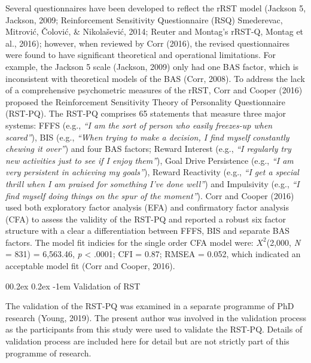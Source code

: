 \documentclass[
  english,
  man,floatsintext]{apa6}
\makeatletter
\renewcommand{\paragraph}{\@startsection{paragraph}{4}{\parindent}%
  {0\baselineskip \@plus 0.2ex \@minus 0.2ex}%
  {-1em}%
  {\normalfont\normalsize\bfseries\itshape\typesectitle}}
\makeatother
\begin{document}
Several questionnaires have been developed to reflect the rRST model (Jackson 5, Jackson, 2009; Reinforcement Sensitivity Questionnaire (RSQ) Smederevac, Mitrović, Čolović, \& Nikolašević, 2014; Reuter and Montag's rRST-Q, Montag et al., 2016); however, when reviewed by Corr (2016), the revised questionnaires were found to have significant theoretical and operational limitations.
For example, the Jackson 5 scale (Jackson, 2009) only had one BAS factor, which is inconsistent with theoretical models of the BAS (Corr, 2008).
To address the lack of a comprehensive psychometric measures of the rRST, Corr and Cooper
(2016) proposed the Reinforcement Sensitivity Theory of Personality Questionnaire (RST-PQ).
The RST-PQ comprises 65 statements that measure three major systems: FFFS (e.g., \emph{\enquote{I am the sort of person who easily freezes-up when scared}}), BIS (e.g., \emph{\enquote{When trying to make a decision, I find myself constantly chewing it over}}) and four BAS factors; Reward Interest (e.g., \emph{\enquote{I regularly try new activities just to see if I enjoy them}}), Goal Drive Persistence (e.g., \emph{\enquote{I am very persistent in achieving my goals}}), Reward Reactivity (e.g., \emph{\enquote{I get a special thrill when I am praised for something I've done well}}) and Impulsivity (e.g., \emph{\enquote{I find myself doing things on the spur of the moment}}).
Corr and Cooper (2016) used both exploratory factor analysis (EFA) and confirmatory factor analysis (CFA) to assess the validity of the RST-PQ and reported a robust six factor structure with a clear a differentiation between FFFS, BIS and separate BAS factors.
The model fit indicies for the single order CFA model were: \(X^2\)(2,000, \emph{N} = 831) = 6,563.46, \emph{p} \textless{} .0001; CFI = 0.87; RMSEA = 0.052, which indicated an acceptable model fit (Corr and Cooper, 2016).

\hypertarget{validation-of-rst}{%
\paragraph{Validation of RST}\label{validation-of-rst}}

The validation of the RST-PQ was examined in a separate programme of PhD research (Young, 2019).
The present author was involved in the validation process as the participants from this study were used to validate the RST-PQ.
Details of validation process are included here for detail but are not strictly part of this programme of research.
\end{document}
